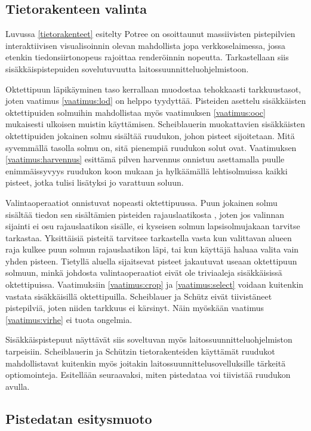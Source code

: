 \subsection{Tietorakenteen valinta}

Luvussa \ref{tietorakenteet} esitelty Potree on osoittaunut massiivisten pistepilvien interaktiivisen visualisoinnin olevan mahdollista jopa verkkoselaimessa, jossa etenkin tiedonsiirtonopeus rajoittaa renderöinnin nopeutta. Tarkastellaan siis sisäkkäispistepuiden sovelutuvuutta laitossuunnitteluohjelmistoon. 

Oktettipuun läpikäyminen taso kerrallaan muodostaa tehokkaasti tarkkuustasot, joten vaatimus \ref{vaatimus:lod} on helppo tyydyttää. Pisteiden asettelu sisäkkäisten oktettipuiden solmuihin mahdollistaa myös vaatimuksen \ref{vaatimus:ooc} mukaisesti ulkoisen muistin käyttämisen. Scheiblauerin muokattavien sisäkkäisten oktettipuiden jokainen solmu sisältää ruudukon, johon pisteet sijoitetaan. Mitä syvemmällä tasolla solmu on, sitä pienempiä ruudukon solut ovat. Vaatimuksen \ref{vaatimus:harvennus} esittämä pilven harvennus onnistuu asettamalla puulle enimmäissyvyys ruudukon koon mukaan ja hylkäämällä lehtisolmuissa kaikki pisteet, jotka tulisi lisätyksi jo varattuun soluun. 

Valintaoperaatiot onnistuvat nopeasti oktettipuussa. Puun jokainen solmu sisältää tiedon sen sisältämien pisteiden rajauslaatikosta , joten jos valinnan sijainti ei osu rajauslaatikon sisälle, ei kyseisen solmun lapsisolmujakaan tarvitse tarkastaa. Yksittäisiä pisteitä tarvitsee tarkastella vasta kun valittavan alueen raja kulkee puun solmun rajauslaatikon läpi, tai kun käyttäjä haluaa valita vain yhden pisteen. Tietyllä aluella sijaitsevat pisteet jakautuvat useaan oktettipuun solmuun, minkä johdosta valintaoperaatiot eivät ole triviaaleja sisäkkäisissä oktettipuissa. Vaatimuksiin \ref{vaatimus:crop} ja \ref{vaatimus:select} voidaan kuitenkin vastata sisäkkäisillä oktettipuilla. Scheiblauer ja Schütz eivät tiivistäneet pistepilviä, joten niiden tarkkuus ei kärsinyt. Näin myöskään vaatimus \ref{vaatimus:virhe} ei tuota ongelmia.

Sisäkkäispistepuut näyttävät siis soveltuvan myös laitossuunnitteluohjelmiston tarpeisiin. Scheiblauerin ja Schützin tietorakenteiden käyttämät ruudukot mahdollistavat kuitenkin myös joitakin laitossuunnittelusovelluksille tärkeitä optiomointeja. Esitellään seuraavaksi, miten pistedataa voi tiivistää ruudukon avulla.


\subsection{Pistedatan esitysmuoto}\label{kompressio}

